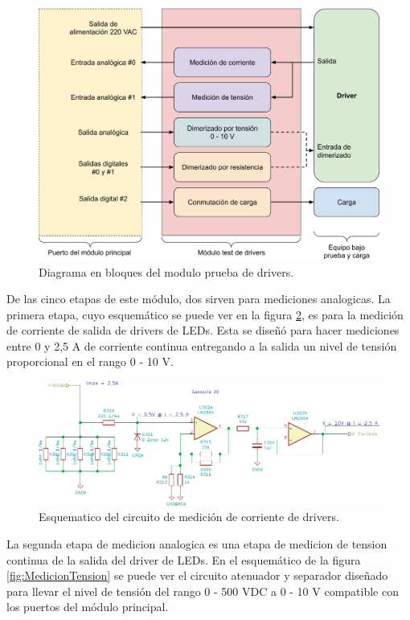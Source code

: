 \begin{figure}[H]
	\centering
	\includegraphics[width=1\textwidth]{./Figures/BloquesTestDriver.pdf}
	\caption{Diagrama en bloques del modulo prueba de drivers.}
	\label{fig:BloquesTestDriver}
\end{figure}


De las cinco etapas de este módulo, dos sirven para mediciones analogicas. La primera etapa, cuyo esquemático se puede ver en la figura \ref{fig:MedicionCorriente}, es para la medición de corriente de salida de drivers de LEDs. Esta se diseñó para hacer mediciones entre 0 y 2,5 A de corriente continua entregando a la salida un nivel de tensión proporcional en el rango 0 - 10 V.

\begin{figure}[H]
	\centering
	\includegraphics[width=1\textwidth]{./Figures/MedicionCorriente.pdf}
	\caption{Esquematico del circuito de medición de corriente de drivers.}
	\label{fig:MedicionCorriente}
\end{figure}

La segunda etapa de medicion analogica es una etapa de medicion de tension continua de la salida del driver de LEDs. En el esquemático de la figura \ref{fig:MedicionTension} se puede ver el circuito atenuador y separador diseñado para llevar el nivel de tensión del rango 0 - 500 VDC a 0 - 10 V compatible con los puertos del módulo principal.

